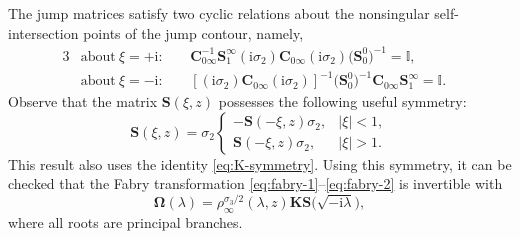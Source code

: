 \documentclass[11pt]{article}
\numberwithin{equation}{section}
\numberwithin{equation}{section}
\newcommand{\ii}{\mathrm{i}}
\begin{document}
The jump matrices satisfy two cyclic relations about the nonsingular self-intersection points of the jump contour, namely,
 \begin{alignat*}{3}
 &\text{about}\ \xi = +\ii\colon\ &&\mathbf{C}_{0\infty}^{-1} \mathbf{S}_1^\infty (\ii \sigma_2) \mathbf{C}_{0\infty} (\ii \sigma_2) \big(\mathbf{S}_0^0\big)^{-1} = \mathbb{I}, &\\
 &\text{about}\ \xi = -\ii\colon\ &&\left[(\ii \sigma_2) \mathbf{C}_{0\infty} (\ii \sigma_2)\right]^{-1} \big(\mathbf{S}_{0}^0\big)^{-1}\mathbf{C}_{0\infty}\mathbf S_1^\infty = \mathbb{I}.&
\end{alignat*}
Observe that the matrix ${\mathbf{S}}(\xi, z)$ possesses the following useful symmetry:
\begin{equation}
{\mathbf{S}}(\xi, z) = \sigma_2 \begin{cases}
 -{\mathbf{S}}(-\xi, z) \sigma_2, & |\xi|<1, \\
{\mathbf{S}}(-\xi, z) \sigma_2, & |\xi|>1.
\label{eq:S-symmetry}
\end{cases}
\end{equation}
This result also uses the identity \eqref{eq:K-symmetry}. Using this symmetry, it can be checked that the Fabry transformation \eqref{eq:fabry-1}--\eqref{eq:fabry-2} is invertible with{\samepage
\begin{equation}
\mathbf \Omega(\lambda ) = \rho_\infty^{\sigma_3/2}(\lambda, z) \mathbf{K} \mathbf S\big(\sqrt{-\ii \lambda}\big),
\label{eq:inverse-fabry}
\end{equation}
where all roots are principal branches.}
\end{document}
